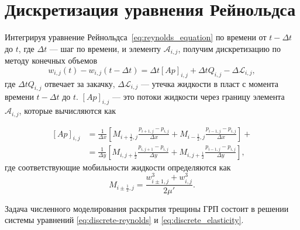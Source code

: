 \chapter{Дискретизация уравнения Рейнольдса}
\label{app:discrete-reynolds}

Интегрируя уравнение Рейнольдса~\eqref{eq:reynolds_equation} по времени от $t-\Delta t$ до $t$, где $\Delta t$ --- шаг по времени, и элементу $\mathcal{A}_{i,j}$, получим дискретизацию по методу конечных объемов
\begin{equation}
    \label{eq:discrete-reynolds}
    w_{i, j}(t) - w_{i, j}(t-\Delta t) = \Delta t[Ap]_{i, j} + \Delta t Q_{i, j} - \Delta \mathcal{L}_{i, j},
\end{equation}
где $\Delta t Q_{i, j}$ отвечает за закачку, $\Delta \mathcal{L}_{i, j}$ --- утечка жидкости в пласт с момента времени $t-\Delta t$ до $t$. $[Ap]_{i, j}$ --- это потоки жидкости через границу элемента $\mathcal{A}_{i,j}$, которые вычисляются как

\begin{equation}
    \begin{split}
        [Ap]_{i, j} &= \frac{1}{\Delta x} \left[M_{i+\frac{1}{2},j} \frac{p_{i+1,j}-p_{i,j}}{\Delta x} + M_{i-\frac{1}{2},j} \frac{p_{i-1,j}-p_{i,j}}{\Delta x} \right] + \\
        &= \frac{1}{\Delta y} \left[M_{i,j+\frac{1}{2}} \frac{p_{i,j+1}-p_{i,j}}{\Delta y} + M_{i,j+\frac{1}{2}} \frac{p_{i-1,j}-p_{i,j}}{\Delta y} \right],
    \end{split}
\end{equation}
где соответствующие мобильности жидкости определяются как
\begin{equation}
    M_{i \pm \frac{1}{2},j} = \frac{w^3_{i \pm 1,j} + w^3_{i,j}}{2\mu'}.
\end{equation}

Задача численного моделирования раскрытия трещины ГРП состоит в решении системы уравнений \eqref{eq:discrete-reynolds} и \eqref{eq:discrete_elasticity}.
